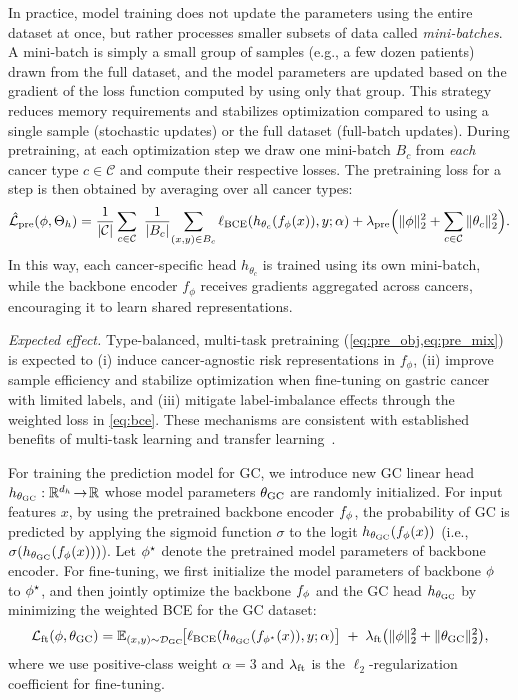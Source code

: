 \documentclass[diagnostics,article,submit,pdftex,moreauthors]{Definitions/mdpi}
\begin{document}
In practice, model training does not update the parameters using the entire dataset at once, but rather processes smaller subsets of data called \emph{mini-batches}. 
A mini-batch is simply a small group of samples (e.g., a few dozen patients) drawn from the full dataset, and the model parameters are updated based on the gradient of the loss function computed by using only that group. 
This strategy reduces memory requirements and stabilizes optimization compared to using a single sample (stochastic updates) or the full dataset (full-batch updates).
During pretraining, at each optimization step we draw one mini-batch $B_c$ from \emph{each} cancer type $c\in\mathcal{C}$ and compute their respective losses. 
The pretraining loss for a step is then obtained by averaging over all cancer types:
\begin{equation}
  \label{eq:pre_mix}
  \hat{\mathcal{L}}_{\mathrm{pre}}(\phi,\Theta_h)
  =\frac{1}{|\mathcal{C}|}\sum_{c\in\mathcal{C}}\ \frac{1}{|B_c|}\!
  \sum_{(x,y)\in B_c}\ell_{\mathrm{BCE}}(h_{\theta_c}(f_\phi(x)),y;\alpha) 
  + \lambda_{\mathrm{pre}} \Big( \|\phi\|_2^2 + \sum_{c\in\mathcal{C}} \|\theta_c\|_2^2 \Big).
\end{equation}
In this way, each cancer-specific head $h_{\theta_c}$ is trained using its own mini-batch, while the backbone encoder $f_\phi$ receives gradients aggregated across cancers, encouraging it to learn shared representations.

\textit{Expected effect.} Type-balanced, multi-task pretraining (\cref{eq:pre_obj,eq:pre_mix}) is expected to (i) induce cancer-agnostic risk representations in $f_\phi$, (ii) improve sample efficiency and stabilize optimization when fine-tuning on gastric cancer with limited labels, and (iii) mitigate label-imbalance effects through the weighted loss in \cref{eq:bce}.
These mechanisms are consistent with established benefits of multi-task learning and transfer learning~\citep{Caruana1997_MTL,Pan2010_TLsurvey,Yosinski2014_transferable,He2009_Imbalanced}.

For training the prediction model for GC, we introduce new GC linear head $h_{\theta_{\mathrm{GC}}}:\mathbb{R}^{d_{h}}\!\to\!\mathbb{R}$ whose model parameters $\theta_{\mathrm{GC}}$ are randomly initialized.
For input features $x$, by using the pretrained backbone encoder $f_{\phi}$, the probability of GC is predicted by applying the sigmoid function $\sigma$ to the logit $h_{\theta_{\mathrm{GC}}}(f_{\phi}(x))$ (i.e., $\sigma(h_{\theta_{\mathrm{GC}}}(f_{\phi}(x)))$).
Let $\phi^\star$ denote the pretrained model parameters of backbone encoder.
For fine-tuning, we first initialize the model parameters of backbone $\phi$ to $\phi^\star$, and then jointly optimize the backbone $f_{\phi}$ and the GC head $h_{\theta_{\mathrm{GC}}}$ by minimizing the weighted BCE for the GC dataset:
\begin{equation}
\label{eq:ft_obj}
\mathcal{L}_{\mathrm{ft}}(\phi,\theta_{\mathrm{GC}}) = \mathbb{E}_{(x,y)\sim \mathcal{D}_{\mathrm{GC}}}\!\big[\ell_{\mathrm{BCE}}(h_{\theta_{\mathrm{GC}}}(f_{\phi^\star}(x)),y;\alpha)\big]\;+\;\lambda_{\mathrm{ft}} \big( \|\phi\|_2^2 + \|\theta_{\mathrm{GC}}\|_2^2 \big),
\end{equation}
where we use positive-class weight $\alpha{=}3$ and $\lambda_{\mathrm{ft}}$ is the $\ell_2$-regularization coefficient for fine-tuning.
\end{document}
